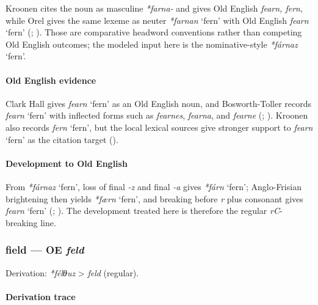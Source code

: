 \documentclass[
  british,
  a4paper,
]{article}
\providecommand{\Recon}[1]{\emph{*#1}}
\begin{document}
Kroonen cites the noun as masculine \emph{*farna-} and gives Old English
\emph{fearn, fern}, while Orel gives the same lexeme as neuter
\Recon{farnan} `fern' with Old English {\emph{fearn}} `fern'
(; ). Those are comparative headword conventions rather than
competing Old English outcomes; the modeled input here is the
nominative-style \Recon{fárnaz} `fern'.

\paragraph{Old English evidence}\label{old-english-evidence-17}

Clark Hall gives {\emph{fearn}} `fern' as an Old English noun, and
Bosworth-Toller records {\emph{fearn}} `fern' with inflected forms such
as \emph{fearnes}, \emph{fearna}, and \emph{fearne}
(;
).
Kroonen also records {\emph{fern}} `fern', but the local lexical sources
give stronger support to {\emph{fearn}} `fern' as the citation target
().

\paragraph{Development to Old
English}\label{development-to-old-english-17}

From \Recon{fárnaz} `fern', loss of final \emph{-z} and final \emph{-a}
gives \Recon{fárn} `fern'; Anglo-Frisian brightening then yields
\Recon{færn} `fern', and breaking before \emph{r} plus consonant gives
{\emph{fearn}} `fern' (;
). The development
treated here is therefore the regular \emph{rC}-breaking line.

\subsubsection{\texorpdfstring{field --- OE
\emph{feld}}{field --- OE feld}}\label{field-oe-feld}

Derivation: \emph{*félθuz} \textgreater{} \emph{feld} (regular).

\paragraph{Derivation trace}\label{derivation-trace-19}
\end{document}

